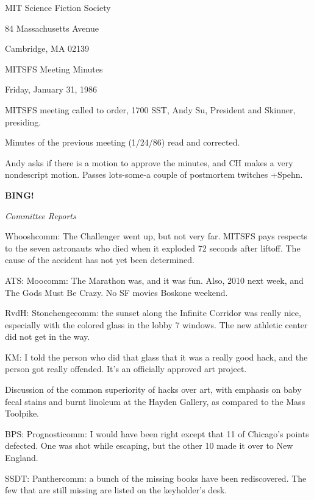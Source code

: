 \documentclass[12pt]{article}
\newcommand{\bing}{{\bf BING!} }
\newcommand{\goto}[1]{\bing \vskip 12pt \centerline{{\em{#1}}}}
\begin{document}
\begin{center}

MIT Science Fiction Society 

84 Massachusetts Avenue

Cambridge, MA 02139

\vspace{12pt}

MITSFS Meeting Minutes 

Friday, January 31, 1986

\end{center}
 
\vspace{18pt}

\setlength{\parskip}{6pt}

\noindent
MITSFS meeting called to order, 1700 SST,
Andy Su, President and Skinner, presiding.

Minutes of the previous meeting (1/24/86) read and corrected.

Andy asks if there is a motion to approve the minutes, and CH makes a very nondescript motion. Passes lots-some-a couple of postmortem twitches +Spehn.

\goto{Committee Reports}

Whooshcomm: The Challenger went up, but not very far. MITSFS pays respects to the seven astronauts who died when it exploded 72 seconds after liftoff. The cause of the accident has not yet been determined.

ATS: Moocomm: The Marathon was, and it was fun. Also, 2010 next week, and The Gods Must Be Crazy. No SF movies Boskone weekend.

RvdH: Stonehengecomm: the sunset along the Infinite Corridor was really nice, especially with the colored glass in the lobby 7 windows. The new athletic center did not get in the way.

KM: I told the person who did that glass that it was a really good hack, and the person got really offended. It's an officially approved art project.

Discussion of the common superiority of hacks over art, with emphasis on baby fecal stains and burnt linoleum at the Hayden Gallery, as compared to the Mass Toolpike.

BPS: Prognosticomm: I would have been right except that 11 of Chicago's points defected. One was shot while escaping, but the other 10 made it over to New England.

SSDT: Panthercomm: a bunch of the missing books have been rediscovered. The few that are still missing are listed on the keyholder's desk.
\end{document}
